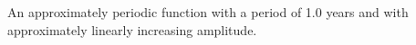 An approximately periodic function with a period of 1.0 years and with approximately linearly increasing amplitude.